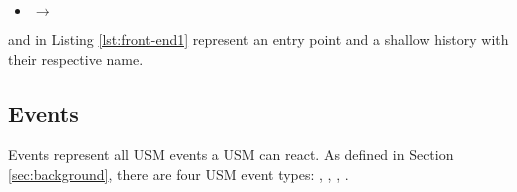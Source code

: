 \begin{itemize}[\footnotesize]
\item {} $\rightarrow$  









\end{itemize}

\noindent
{}

 and  in Listing \ref{lst:front-end1} represent an entry point and a shallow history with their respective name.  

\subsection{Events}
\label{subsec:events}

Events represent all USM events a USM can react.
As defined in Section \ref{sec:background}, there are four USM event types: , , , . %

